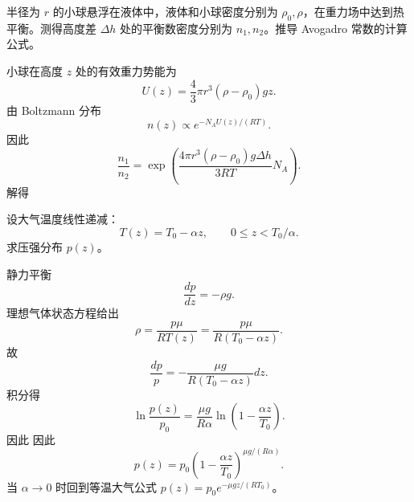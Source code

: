 \begin{question}
半径为 $r$ 的小球悬浮在液体中，液体和小球密度分别为 $\rho_0,\rho$，在重力场中达到热平衡。测得高度差 $\Delta h$ 处的平衡数密度分别为 $n_1,n_2$。推导 Avogadro 常数的计算公式。
\begin{solution}

小球在高度 $z$ 处的有效重力势能为
\[
 U(z)=\frac43\pi r^3(\rho-\rho_0)gz.
\]
由 Boltzmann 分布
\[
 n(z)\propto e^{-N_AU(z)/(RT)}.
\]
因此
\[
\frac{n_1}{n_2}=\exp\left(\frac{4\pi r^3(\rho-\rho_0)g\Delta h}{3RT}N_A\right).
\]
解得
\end{solution}
\end{question}

\begin{question}
设大气温度线性递减：
\[
T(z)=T_0-\alpha z,
\qquad 0\le z<T_0/\alpha.
\]
求压强分布 $p(z)$。
\begin{solution}

静力平衡
\[
\frac{dp}{dz}=-\rho g.
\]
理想气体状态方程给出
\[
\rho=\frac{p\mu}{RT(z)}=\frac{p\mu}{R(T_0-\alpha z)}.
\]
故
\[
\frac{dp}{p}=-\frac{\mu g}{R(T_0-\alpha z)}dz.
\]
积分得
\[
\ln\frac{p(z)}{p_0}=\frac{\mu g}{R\alpha}\ln\left(1-\frac{\alpha z}{T_0}\right).
\]
因此
因此
\[
p(z)=p_0\left(1-\frac{\alpha z}{T_0}\right)^{\mu g/(R\alpha)}.
\]
当 $\alpha\to0$ 时回到等温大气公式 $p(z)=p_0e^{-\mu gz/(RT_0)}$。
\end{solution}
\end{question}


